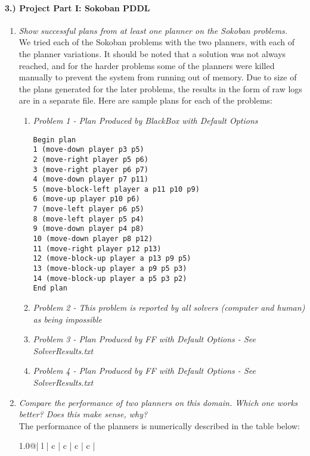 \documentclass{article}
\begin{document}
\paragraph{3.) Project Part I: Sokoban PDDL}
\begin{enumerate}
\item{\textit{Show successful plans from at least one planner on the Sokoban problems.\\}}
We tried each of the Sokoban problems with the two planners, with each of the planner variations.  It should be noted that a solution was not always reached, and for the harder problems some of the planners were killed manually to prevent the system from running out of memory.  Due to size of the plans generated for the later problems, the results in the form of raw logs are in a separate file.  Here are sample plans for each of the problems:
\begin{enumerate}
\item{\emph{Problem 1 - Plan Produced by BlackBox with Default Options}
\begin{verbatim}
Begin plan
1 (move-down player p3 p5)
2 (move-right player p5 p6)
3 (move-right player p6 p7)
4 (move-down player p7 p11)
5 (move-block-left player a p11 p10 p9)
6 (move-up player p10 p6)
7 (move-left player p6 p5)
8 (move-left player p5 p4)
9 (move-down player p4 p8)
10 (move-down player p8 p12)
11 (move-right player p12 p13)
12 (move-block-up player a p13 p9 p5)
13 (move-block-up player a p9 p5 p3)
14 (move-block-up player a p5 p3 p2)
End plan
\end{verbatim}
}
\item{\emph{Problem 2 - This problem is reported by all solvers (computer and human) as being impossible}}
\item{\emph{Problem 3 - Plan Produced by FF with Default Options - See SolverResults.txt}}
\item{\emph{Problem 4 - Plan Produced by FF with Default Options - See SolverResults.txt}}
\end{enumerate}
\item{\textit{Compare the performance of two planners on this domain. Which one works better? Does this make sense, why?\\}
The performance of the planners is numerically described in the table below:
\begin{center}
\begin{table}[h!]
\begin{tabular*}{1.0\textwidth}{@{\extracolsep{\fill}}| l | c | c | c | c |}
\hline
{} \\ \hline

\end{tabular*}
\end{table}
\end{center}}
\end{enumerate}
\end{document}

